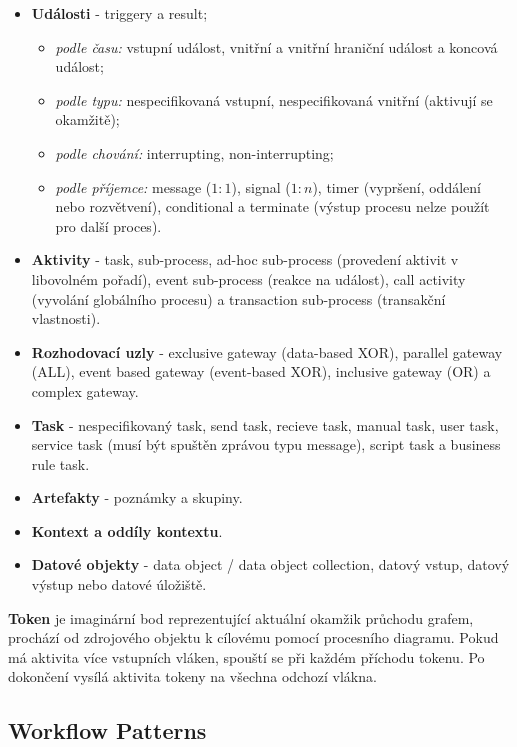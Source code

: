 \begin{itemize}
    \item \textbf{Události} - triggery a result;
    \begin{itemize}
        \item \textit{podle času:} vstupní událost, vnitřní a vnitřní hraniční událost a koncová událost;
        \item \textit{podle typu:} nespecifikovaná vstupní, nespecifikovaná vnitřní (aktivují se okamžitě);
        \item \textit{podle chování:} interrupting, non-interrupting;
        \item \textit{podle příjemce:} message ($1:1$), signal ($1:n$), timer (vypršení, oddálení nebo rozvětvení), conditional a terminate (výstup procesu nelze použít pro další proces).
    \end{itemize}  
    \item \textbf{Aktivity} - task, sub-process, ad-hoc sub-process (provedení aktivit v libovolném pořadí), event sub-process (reakce na událost), call activity (vyvolání globálního procesu) a transaction sub-process (transakční vlastnosti).
    \item \textbf{Rozhodovací uzly} - exclusive gateway (data-based XOR), parallel gateway (ALL), event based gateway (event-based XOR), inclusive gateway (OR) a complex gateway.
    \item \textbf{Task} - nespecifikovaný task, send task, recieve task, manual task, user task, service task (musí být spuštěn zprávou typu message), script task a business rule task.
    \item \textbf{Artefakty} - poznámky a skupiny.
    \item \textbf{Kontext a oddíly kontextu}.
    \item \textbf{Datové objekty} - data object / data object collection, datový vstup, datový výstup nebo datové úložiště.
\end{itemize}

\textbf{Token} je imaginární bod reprezentující aktuální okamžik průchodu grafem, prochází od zdrojového objektu k cílovému pomocí procesního diagramu. Pokud má aktivita více vstupních vláken, spouští se při každém příchodu tokenu. Po dokončení vysílá aktivita tokeny na všechna odchozí vlákna.

\subsection{Workflow Patterns}

